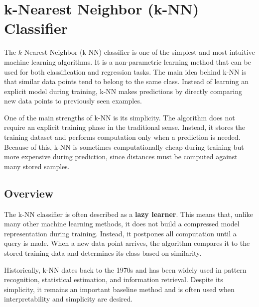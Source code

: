 \documentclass{article}
\begin{document}


\section{k-Nearest Neighbor (k-NN) Classifier}

The \(k\)-Nearest Neighbor (k-NN) classifier is one of the simplest and most intuitive machine learning algorithms. It is a non-parametric learning method that can be used for both classification and regression tasks. The main idea behind k-NN is that similar data points tend to belong to the same class. Instead of learning an explicit model during training, k-NN makes predictions by directly comparing new data points to previously seen examples.

One of the main strengths of k-NN is its simplicity. The algorithm does not require an explicit training phase in the traditional sense. Instead, it stores the training dataset and performs computation only when a prediction is needed. Because of this, k-NN is sometimes computationally cheap during training but more expensive during prediction, since distances must be computed against many stored samples.

\subsection{Overview}

The k-NN classifier is often described as a \textbf{lazy learner}. This means that, unlike many other machine learning methods, it does not build a compressed model representation during training. Instead, it postpones all computation until a query is made. When a new data point arrives, the algorithm compares it to the stored training data and determines its class based on similarity.

Historically, k-NN dates back to the 1970s and has been widely used in pattern recognition, statistical estimation, and information retrieval. Despite its simplicity, it remains an important baseline method and is often used when interpretability and simplicity are desired.
\end{document}
